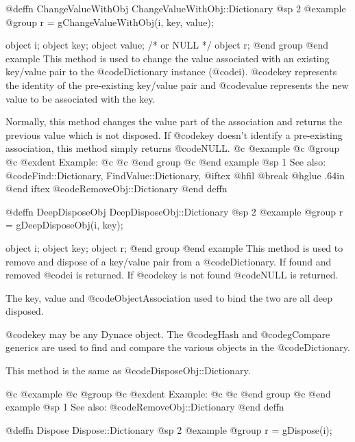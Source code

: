 @deffn {ChangeValueWithObj} ChangeValueWithObj::Dictionary
@sp 2
@example
@group
r = gChangeValueWithObj(i, key, value);

object  i;
object  key;
object  value;    /*  or NULL   */
object  r;
@end group
@end example
This method is used to change the value associated with an existing
key/value pair to the @code{Dictionary} instance (@code{i}).
@code{key} represents the identity of the pre-existing key/value
pair and @code{value} represents the new value to be associated with
the key.

Normally, this method changes the value part of the association
and returns the previous value which is not disposed.  If
@code{key} doesn't identify a pre-existing association, this method
simply returns @code{NULL}.
@c @example
@c @group
@c @exdent Example:
@c 
@c @end group
@c @end example
@sp 1
See also:  @code{Find::Dictionary, FindValue::Dictionary,}
@iftex
@hfil @break @hglue .64in      
@end iftex
@code{RemoveObj::Dictionary}
@end deffn












@deffn {DeepDisposeObj} DeepDisposeObj::Dictionary
@sp 2
@example
@group
r = gDeepDisposeObj(i, key);

object  i;
object  key;
object  r;
@end group
@end example
This method is used to remove and dispose of a key/value pair from a
@code{Dictionary}.  If found and removed @code{i} is returned.  If @code{key}
is not found @code{NULL} is returned.

The key, value and @code{ObjectAssociation} used to bind the two are all deep
disposed.

@code{key} may be any Dynace object.  The @code{gHash} and
@code{gCompare} generics are used to find and compare the various
objects in the @code{Dictionary}.

This method is the same as @code{DisposeObj::Dictionary}.

@c @example
@c @group
@c @exdent Example:
@c 
@c @end group
@c @end example
@sp 1
See also:  @code{RemoveObj::Dictionary}
@end deffn











@deffn {Dispose} Dispose::Dictionary
@sp 2
@example
@group
r = gDispose(i);


